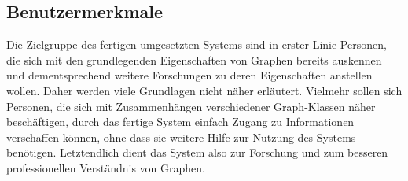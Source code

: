 \documentclass[10pt,a4paper]{article}
\begin{document}
\begin{enumerate}[leftmargin=.9cm]
\end{enumerate}
     
    \subsection{Benutzermerkmale} %
	Die Zielgruppe des fertigen umgesetzten Systems sind in erster Linie Personen, die sich mit den grundlegenden Eigenschaften von Graphen bereits auskennen und dementsprechend weitere Forschungen zu deren Eigenschaften anstellen wollen. Daher werden viele Grundlagen nicht näher erläutert. Vielmehr sollen sich Personen, die sich mit Zusammenhängen verschiedener Graph-Klassen näher beschäftigen, durch das fertige System einfach Zugang zu Informationen verschaffen können, ohne dass sie weitere Hilfe zur Nutzung des Systems benötigen.
	Letztendlich dient das System also zur Forschung und zum besseren professionellen Verständnis von Graphen.
\end{document}
